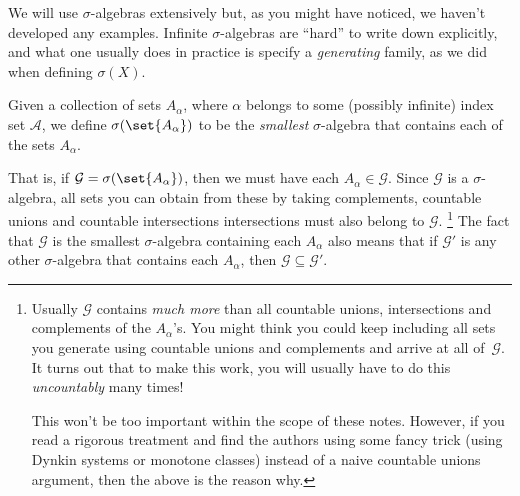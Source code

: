 We will use $\sigma$-algebras extensively but, as you might have noticed, we haven't developed any examples.
Infinite $\sigma$-algebras are ``hard'' to write down explicitly, and what one usually does in practice is specify a \emph{generating} family, as we did when defining $\sigma(X)$.
\begin{definition}
  Given a collection of sets $A_\alpha$, where $\alpha$ belongs to some (possibly infinite) index set $\mathcal A$, we define $\sigma(\set{A_\alpha})$ to be the \emph{smallest} $\sigma$-algebra that contains each of the sets $A_\alpha$.
\end{definition}

That is, if $\mathcal G = \sigma(\set{A_\alpha})$, then we must have each $A_\alpha \in \mathcal G$.
Since $\mathcal G$ is a $\sigma$-algebra, all sets you can obtain from these by taking complements, countable unions and countable intersections intersections must also belong to $\mathcal G$.%
\footnote{
  Usually $\mathcal G$ contains \emph{much more} than all countable unions, intersections and complements of the $A_\alpha$'s.
  You might think you could keep including all sets you generate using countable unions and complements and arrive at all of~$\mathcal G$.
  It turns out that to make this work, you will usually have to do this \emph{uncountably} many times!

  This won't be too important within the scope of these notes.
  However, if you read a rigorous treatment and find the authors using some fancy trick (using Dynkin systems or monotone classes) instead of a naive countable unions argument, then the above is the reason why.
}
The fact that $\mathcal G$ is the smallest $\sigma$-algebra containing each $A_\alpha$ also means that if $\mathcal G'$ is any other $\sigma$-algebra that contains each $A_\alpha$, then $\mathcal G \subseteq \mathcal G'$.


